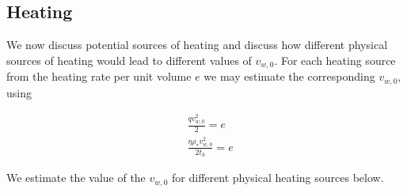 \documentclass[usenatbib,fleqn]{mn2e}
\newcommand{\rhostar}{\rho_*}
\newcommand{\vwO}{v_{w,0}}
\begin{document}
\subsection{Heating}
We now discuss potential sources of heating and discuss how different
physical sources of heating would lead to different values of
$\vwO$. For each heating source from the heating rate per unit volume
$e$ we may estimate the corresponding $\vwO$, using

\begin{align}
  &\frac{q \vwO^2}{2}=e\\
  &\frac{\eta \rhostar \vwO^2}{2 t_h}=e
  \label{eq:vw_eff}
\end{align}

We estimate the value of the $\vwO$ for different physical heating
sources below.
\end{document}
